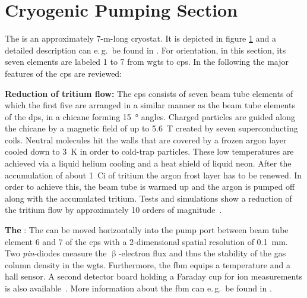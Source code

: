 \section{Cryogenic Pumping Section}
\label{sec:katrinExpSetupCryoPumpingSection}
\begin{figure}[t]
 \label{fig:katrinExpSetupCryoPumpingSection}
\end{figure}
The  is an approximately 7-m-long cryostat. It is depicted in figure \ref{fig:katrinExpSetupCryoPumpingSection} and a detailed description can e.\,g.~be found in \cite{Jansen2015}. For orientation, in this section, its seven elements are labeled 1 to 7 from \gls{wgts} to \gls{cps}. In the following the major features of the \gls{cps} are reviewed:

{\par\textbf{Reduction of tritium flow:}
The \gls{cps} consists of seven beam tube elements of which the first five are arranged in a similar manner as the beam tube elements of the \gls{dps}, in a chicane forming \SI{15}{\degree} angles. Charged particles are guided along the chicane by a magnetic field of up to \SI{5.6}{T} created by seven superconducting coils. Neutral molecules hit the walls that are covered by a frozen argon layer cooled down to \SI{3}{K} in order to cold-trap particles. These low temperatures are achieved via a liquid helium cooling and a heat shield of liquid neon. After the accumulation of about \SI{1}{Ci} of tritium the argon frost layer has to be renewed. In order to achieve this, the beam tube is warmed up and the argon is pumped off along with the accumulated tritium. Tests and simulations show a reduction of the tritium flow by approximately 10 orders of magnitude~\cite{Jansen2015,Roettele2019}.}

{\par\textbf{The }: 
The  can be moved horizontally into the pump port between beam tube element 6 and 7 of the \gls{cps} with a 2-dimensional spatial resolution of \SI{0.1}{mm}. Two \textit{pin}-diodes measure the $\upbeta$-electron flux and thus the stability of the gas column density in the \gls{wgts}. Furthermore, the \gls{fbm} equips a temperature and a hall sensor. A second detector board holding a Faraday cup for ion measurements is also available~\cite{Klein2019}. More information about the \gls{fbm} can e.\,g.~be found in \cite{Ellinger2017,Ellinger2019}.}

